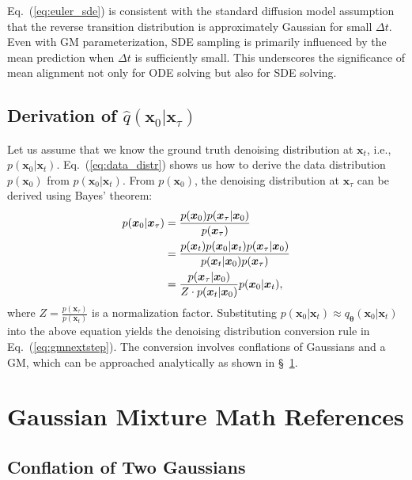 \documentclass{article}
\def\vtheta{{\bm{\theta}}}
\def\vx{{\bm{x}}}
\theoremstyle{custom}
\theoremstyle{definition}
\theoremstyle{remark}
\begin{document}
Eq.~(\ref{eq:euler_sde}) is consistent with the standard diffusion model assumption that the reverse transition distribution is approximately Gaussian for small $\Delta t$. Even with GM parameterization, SDE sampling is primarily influenced by the mean prediction when $\Delta t$ is sufficiently small. This underscores the significance of mean alignment not only for ODE solving but also for SDE solving.

\subsection{Derivation of $\hat{q}(\vx_0|\vx_\tau)$}
\label{sec:conversion_derivation}

Let us assume that we know the ground truth denoising distribution at $\vx_t$, i.e., $p(\vx_0|\vx_t)$. Eq.~(\ref{eq:data_distr}) shows us how to derive the data distribution $p(\vx_0)$ from $p(\vx_0|\vx_t)$. From $p(\vx_0)$, the denoising distribution at $\vx_\tau$ can be derived using Bayes' theorem:
\begin{align}
    p(\vx_0|\vx_\tau) 
    &= \frac{p(\vx_0) p(\vx_\tau | \vx_0)}{p(\vx_\tau)} \notag \\
    &= \frac{p(\vx_t)p(\vx_0|\vx_t)p(\vx_\tau | \vx_0)}{p(\vx_t|\vx_0) p(\vx_\tau)} \notag \\
    &= \frac{p(\vx_\tau | \vx_0)}{Z \cdot p(\vx_t|\vx_0)} p(\vx_0|\vx_t),
\end{align}
where $Z = \frac{p(\vx_\tau)}{p(\vx_t)}$ is a normalization factor.
Substituting $p(\vx_0|\vx_t) \approx q_\vtheta(\vx_0|\vx_t)$ into the above equation yields the denoising distribution conversion rule in Eq.~(\ref{eq:gmnextstep}).
The conversion involves conflations of Gaussians and a GM, which can be approached analytically as shown in \S~\ref{sec:mathref}.

\section{Gaussian Mixture Math References}
\label{sec:mathref}

\subsection{Conflation of Two Gaussians}
\label{sec:gaussianconflation}
\end{document}
